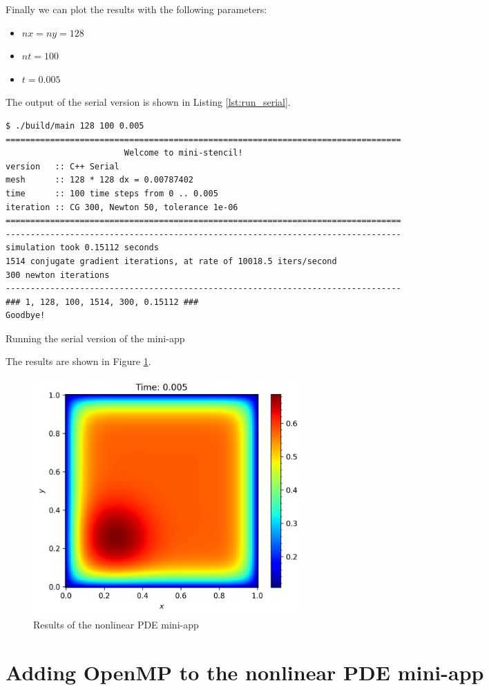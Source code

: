 \documentclass[unicode,11pt,a4paper,oneside,numbers=endperiod,openany]{scrartcl}
\begin{document}
Finally we can plot the results with the following parameters:
\begin{itemize}
    \item $nx = ny = 128$
    \item $nt = 100$
    \item $t = 0.005$
\end{itemize}

The output of the serial version is shown in Listing \ref{lst:run_serial}.

\begin{listing}[h]
    \begin{verbatim}
$ ./build/main 128 100 0.005
================================================================================
                        Welcome to mini-stencil!
version   :: C++ Serial
mesh      :: 128 * 128 dx = 0.00787402
time      :: 100 time steps from 0 .. 0.005
iteration :: CG 300, Newton 50, tolerance 1e-06
================================================================================
--------------------------------------------------------------------------------
simulation took 0.15112 seconds
1514 conjugate gradient iterations, at rate of 10018.5 iters/second
300 newton iterations
--------------------------------------------------------------------------------
### 1, 128, 100, 1514, 300, 0.15112 ###
Goodbye!
    \end{verbatim}
    \caption{Running the serial version of the mini-app}
    \label{lst:run_serial}
\end{listing}

The results are shown in Figure \ref{fig:output_serial}.

\begin{figure}[h!t]
    \centering
    \includegraphics[width=0.5\textwidth]{plots/output_serial.png}
    \caption{Results of the nonlinear PDE mini-app}
    \label{fig:output_serial}
\end{figure}


\section{Adding OpenMP to the nonlinear PDE mini-app}
\end{document}
